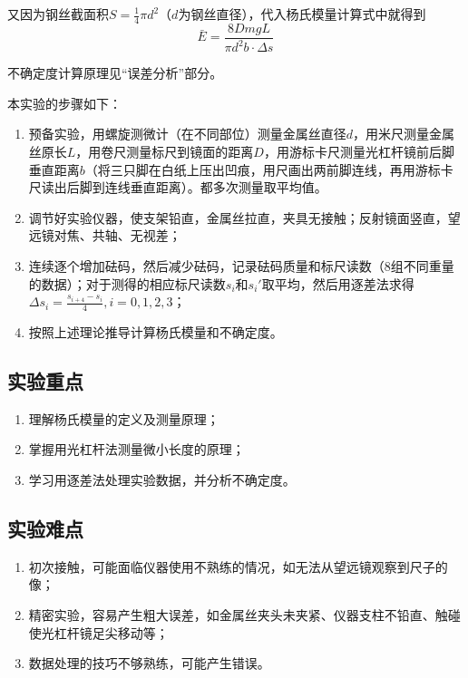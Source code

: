 \documentclass[]{../../templates/Report}%
\begin{document}
又因为钢丝截面积$S = \frac{1}{4} \pi d^2$（$d$为钢丝直径），代入杨氏模量计算式中就得到
\[\bar{E} = \frac{8DmgL}{\pi d^2 b \cdot \Delta s}\]

不确定度计算原理见“误差分析”部分。


本实验的步骤如下：
\begin{enumerate}
    \item 预备实验，用螺旋测微计（在不同部位）测量金属丝直径$d$，用米尺测量金属丝原长$L$，用卷尺测量标尺到镜面的距离$D$，用游标卡尺测量光杠杆镜前后脚垂直距离$b$（将三只脚在白纸上压出凹痕，用尺画出两前脚连线，再用游标卡尺读出后脚到连线垂直距离）。都多次测量取平均值。
    \item 调节好实验仪器，使支架铅直，金属丝拉直，夹具无接触；反射镜面竖直，望远镜对焦、共轴、无视差；
    \item 连续逐个增加砝码，然后减少砝码，记录砝码质量和标尺读数（8组不同重量的数据）；对于测得的相应标尺读数$s_i$和$s_i'$取平均，然后用逐差法求得$\Delta s_i = \frac{s_{i+4} - s_i}{4} , i=0,1,2,3$；
    \item 按照上述理论推导计算杨氏模量和不确定度。
\end{enumerate}
\subsection{实验重点}

\begin{enumerate}
    \item 理解杨氏模量的定义及测量原理；
    \item 掌握用光杠杆法测量微小长度的原理；
    \item 学习用逐差法处理实验数据，并分析不确定度。
\end{enumerate}

\subsection{实验难点}

\begin{enumerate}
    \item 初次接触，可能面临仪器使用不熟练的情况，如无法从望远镜观察到尺子的像；
    \item 精密实验，容易产生粗大误差，如金属丝夹头未夹紧、仪器支柱不铅直、触碰使光杠杆镜足尖移动等；
    \item 数据处理的技巧不够熟练，可能产生错误。
\end{enumerate}
\end{document}
